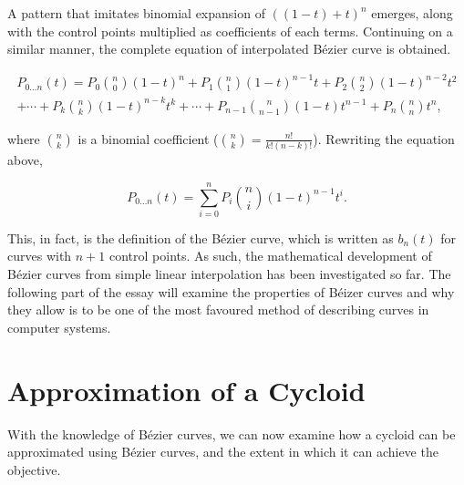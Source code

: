 \documentclass[11pt, oneside]{article}
\theoremstyle{definition}
\numberwithin{figure}{section}
\begin{document}
A pattern that imitates binomial expansion of $((1-t) + t)^n$ emerges, along with the control points multiplied as coefficients of each terms. Continuing on a similar manner, the complete equation of interpolated B\'ezier curve is obtained.

\begin{multline}
P_{0 \dotsc n}(t) = 	P_0 \binom{n}{0}(1-t)^n + P_1 \binom{n}{1}(1-t)^{n-1}t + P_2 \binom{n}{2}(1-t)^{n-2}t^2 \\
				+ \dotsb + P_k \binom{n}{k}(1-t)^{n-k}t^k + \dotsb + P_{n-1} \binom{n}{n-1}(1-t)t^{n-1} + P_n \binom{n}{n}t^n,
\end{multline}

where $\binom{n}{k}$ is a binomial coefficient ($\binom{n}{k} = \frac{n!}{k!(n-k)!}$). Rewriting the equation above,

\begin{equation}
P_{0 \dotsc n}(t) = \sum_{i=0}^{n} {P_i \binom{n}{i} (1-t)^{n-1} t^i}.
\end{equation}

This, in fact, is the definition of the B\'ezier curve, which is written as $b_n(t)$ for curves with $n+1$ control points. As such, the mathematical development of B\'ezier curves from simple linear interpolation has been investigated so far. The following part of the essay will examine the properties of B\'eizer curves and why they allow is to be one of the most favoured method of describing curves in computer systems.

\section{Approximation of a Cycloid}

With the knowledge of B\'ezier curves, we can now examine how a cycloid can be approximated using B\'ezier curves, and the extent in which it can achieve the objective. 

\newpage



\end{document}
